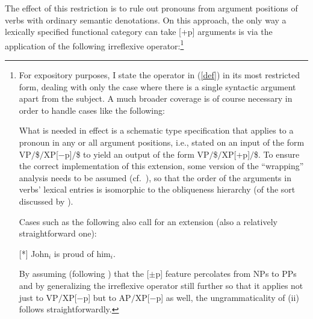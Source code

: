 \documentclass[output=paper,biblatex,babelshorthands,newtxmath,draftmode,colorlinks,citecolor=brown]{langscibook}
\begin{document}
\begin{exe}
 \ex\label{le}
\end{exe}
The effect of this restriction is to rule out pronouns from argument
positions of verbs with ordinary semantic denotations. On this
approach, the only way a lexically specified functional category can
take [+p] arguments is via the application of the following
irreflexive operator:\footnote{For expository purposes, I state the
operator in (\ref{def}) in its most restricted form, dealing with only the
case where there is a single syntactic argument apart from the
subject. A much broader coverage is of course necessary in order to
handle cases like the following:

\begin{exe}
  \begin{xlist}
 \end{xlist}
\end{exe}
What is needed in effect is a schematic type specification that applies
to a pronoun in any or all argument positions, i.e., stated on an
input of the form VP\ensuremath{/}\$\ensuremath{/}XP[$-$p]\ensuremath{/}\$ to yield an output of 
the form VP\ensuremath{/}\$\ensuremath{/}XP[+p]\ensuremath{/}\$. To ensure the correct implementation
of this extension, some version of the ``wrapping'' analysis needs to be
assumed (cf.\ \citealt[194]{Jacobson07}), so that the order of the arguments in 
verbs' lexical entries is isomorphic to the obliqueness hierarchy (of
the sort discussed by \citealt{PS92a}).

Cases such as the following also call for an extension (also a
relatively straightforward one):

\begin{exe}
 [*]{
  John\ensuremath{_i} is proud of him\ensuremath{_i}.
}
\end{exe}
By assuming (following \citealt{Jacobson07}) that the [$\pm$p] feature
percolates from NPs to PPs and by generalizing the irreflexive
operator still further so that it applies not just to VP\ensuremath{/}XP[$-$p] but to
AP\ensuremath{/}XP[$-$p] as well, the ungrammaticality of (ii) follows
straightforwardly.}
\end{document}
